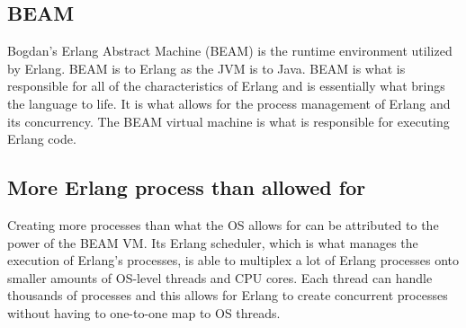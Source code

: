 \documentclass[letterpaper, 10pt]{article}
\begin{document}
\subsection{BEAM}

Bogdan's Erlang Abstract Machine (BEAM) is the runtime environment utilized by Erlang. BEAM is to Erlang as the JVM is to Java. BEAM is what is responsible for all of the characteristics of Erlang and is essentially what brings the language to life. It is what allows for the process management of Erlang and its concurrency. The BEAM virtual machine is what is responsible for executing Erlang code.

\pagebreak

\subsection{More Erlang process than allowed for}

Creating more processes than what the OS allows for can be attributed to the power of the BEAM VM. Its Erlang scheduler, which is what manages the execution of Erlang's processes, is able to multiplex a lot of Erlang processes onto smaller amounts of OS-level threads and CPU cores. Each thread can handle thousands of processes and this allows for Erlang to create concurrent processes without having to one-to-one map to OS threads.
\end{document}
